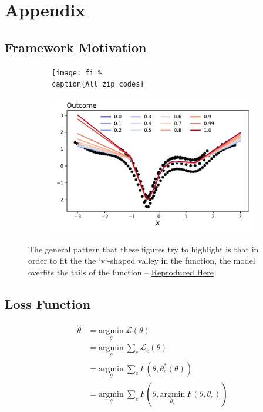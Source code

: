 \documentclass[a4paper,12pt]{article}
\begin{document}
%

\section{Appendix}
\subsection{Framework Motivation}
\begin{figure}[htbp]
\centering
\begin{subfigure}{.48\textwidth}
    \centering
    \texttt{[image: fi
    \%\\caption\{All zip codes]}
\end{subfigure}
\begin{subfigure}{.48\textwidth}
    \centering
    \includegraphics[width=.95\linewidth]{figures/framework/gradient_descent_motivating_example_tune.pdf}
\end{subfigure}
\caption{The general pattern that these figures try to highlight is that in order to fit the the `v`-shaped valley in the function, the model overfits the tails of the function -- \href{https://github.com/pharringtonp19/jmp_paper/blob/main/notebooks/gradient_descent_motivating_example.ipynb}{Reproduced Here}}
\end{figure}
\subsection{Loss Function}
\begin{align*}
    \hat{\theta} &= \underset{\theta}{\textrm{argmin}}\ \mathcal{L}(\theta) \\ 
    &= \underset{\theta}{\textrm{argmin}}\ \sum _c \mathcal{L}_c(\theta)\\ 
    &= \underset{\theta}{\textrm{argmin}}\ \sum _c  F(\theta, \theta^*_c(\theta))\\
    &= \underset{\theta}{\textrm{argmin}}\ \sum _c  F(\theta, \underset{\theta_c}{\textrm{argmin}} \ F(\theta, \theta_c) )\\
\end{align*}
\end{document}
